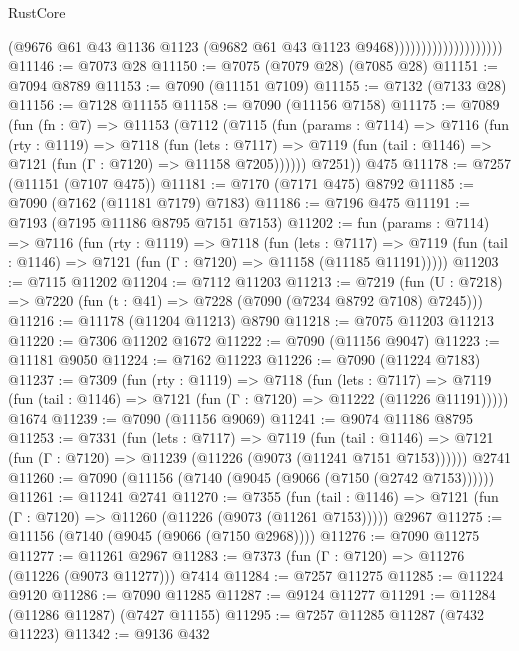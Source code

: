 \begin{lexlean}{RustCore}
\begin{coremodule}
                                        (@9676
                                          @61
                                          @43
                                          @1136
                                          @1123
                                          (@9682 @61 @43 @1123 @9468))))))))))))))))))))
@11146 := @7073 @28
@11150 := @7075 (@7079 @28) (@7085 @28)
@11151 := @7094 @8789
@11153 := @7090 (@11151 @7109)
@11155 := @7132 (@7133 @28)
@11156 := @7128 @11155
@11158 := @7090 (@11156 @7158)
@11175 := @7089
    (fun (fn : @7) =>
    @11153
      (@7112
        (@7115
          (fun (params : @7114) =>
          @7116
            (fun (rty : @1119) =>
            @7118
              (fun (lets : @7117) =>
              @7119 (fun (tail : @1146) => @7121 (fun (Γ : @7120) => @11158 @7205))))))
        @7251))
    @475
@11178 := @7257 (@11151 (@7107 @475))
@11181 := @7170 (@7171 @475) @8792
@11185 := @7090 (@7162 (@11181 @7179) @7183)
@11186 := @7196 @475
@11191 := @7193 (@7195 @11186 @8795 @7151 @7153)
@11202 := fun (params : @7114) =>
  @7116
    (fun (rty : @1119) =>
    @7118
      (fun (lets : @7117) =>
      @7119 (fun (tail : @1146) => @7121 (fun (Γ : @7120) => @11158 (@11185 @11191)))))
@11203 := @7115 @11202
@11204 := @7112 @11203
@11213 := @7219
    (fun (U : @7218) => @7220 (fun (t : @41) => @7228 (@7090 (@7234 @8792 @7108) @7245)))
@11216 := @11178 (@11204 @11213) @8790
@11218 := @7075 @11203 @11213
@11220 := @7306 @11202 @1672
@11222 := @7090 (@11156 @9047)
@11223 := @11181 @9050
@11224 := @7162 @11223
@11226 := @7090 (@11224 @7183)
@11237 := @7309
    (fun (rty : @1119) =>
    @7118
      (fun (lets : @7117) =>
      @7119 (fun (tail : @1146) => @7121 (fun (Γ : @7120) => @11222 (@11226 @11191)))))
    @1674
@11239 := @7090 (@11156 @9069)
@11241 := @9074 @11186 @8795
@11253 := @7331
    (fun (lets : @7117) =>
    @7119
      (fun (tail : @1146) =>
      @7121 (fun (Γ : @7120) => @11239 (@11226 (@9073 (@11241 @7151 @7153))))))
    @2741
@11260 := @7090 (@11156 (@7140 (@9045 (@9066 (@7150 (@2742 @7153))))))
@11261 := @11241 @2741
@11270 := @7355
    (fun (tail : @1146) => @7121 (fun (Γ : @7120) => @11260 (@11226 (@9073 (@11261 @7153)))))
    @2967
@11275 := @11156 (@7140 (@9045 (@9066 (@7150 @2968))))
@11276 := @7090 @11275
@11277 := @11261 @2967
@11283 := @7373 (fun (Γ : @7120) => @11276 (@11226 (@9073 @11277))) @7414
@11284 := @7257 @11275
@11285 := @11224 @9120
@11286 := @7090 @11285
@11287 := @9124 @11277
@11291 := @11284 (@11286 @11287) (@7427 @11155)
@11295 := @7257 @11285 @11287 (@7432 @11223)
@11342 := @9136
    @432

\end{coremodule}
\end{lexlean}
